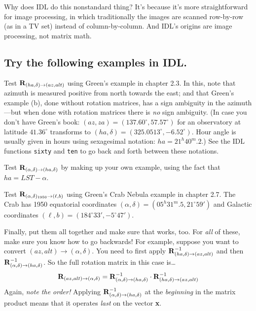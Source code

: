 \documentclass[11pt,preprint]{aastex}
\begin{document}
	Why does IDL do this nonstandard thing? It's because it's more
straightforward for image processing, in which traditionally the images
are scanned row-by-row (as in a TV set) instead of column-by-column. And
IDL's origins are image processing, not matrix math.

\subsection {Try the following examples in IDL.}

	Test ${\bf R}_{(ha, \delta) \rightarrow (az, alt)}$ using
Green's example in chapter 2.3.  In this, note that azimuth is measured
positive from north towards the east; and that Green's example (b), done
without rotation matrices, has a sign ambiguity in the azimuth---but
when done with rotation matrices there is {\it no} sign ambiguity.  (In
case you don't have Green's book: $(az,za)=(137.60^\circ,57.57^\circ)$
for an observatory at latitude $41.36^\circ$ transforms to
$(ha,\delta)=(325.0513^\circ, -6.52^\circ)$. Hour angle is usually given
in hours using sexagesimal notation: $ha=21^h40^m.2$.) See the IDL
functions {\tt sixty} and {\tt ten} to go back and forth between these
notations.

	Test ${\bf R}_{(\alpha, \delta) \rightarrow (ha, \delta)}$ by
making up your own example, using the fact that $ha = LST - \alpha$. 

	Test ${\bf R}_{(\alpha, \delta)_{1950} \rightarrow (\ell, b)}$
using Green's Crab Nebula example in chapter 2.7. The Crab has 1950
equatorial coordinates $(\alpha, \delta)=(05^h31^m.5, 21^\circ59')$ and
Galactic coordinates $(\ell,b)=(184^\circ33', -5^\circ47')$.

	Finally, put them all together and make sure that works, too. 
For {\it all} of these, make sure you know how to go backwards! For
example, suppose you want to convert $(az, alt) \rightarrow (\alpha,
\delta)$.  You need to first apply ${\bf R}_{(ha, \delta) \rightarrow
(az, alt)}^{-1}$ and then ${\bf R}_{(\alpha, \delta) \rightarrow (ha,
\delta)}^{-1}$.  So the full rotation matrix in this case is\dots
\begin{equation}
{\bf R}_{(az, alt) \rightarrow (\alpha, \delta)} = 
{\bf R}_{(\alpha, \delta) \rightarrow (ha, \delta)}^{-1} \cdot
{\bf R}_{(ha, \delta) \rightarrow (az, alt)}^{-1}
\end{equation}
\noindent Again, {\it note the order!} Applying ${\bf R}_{(\alpha,
\delta) \rightarrow (ha, \delta)}^{-1}$ at the {\it beginning} in the
matrix product means that it operates {\it last} on the vector {\bf x}. 
\end{document}
